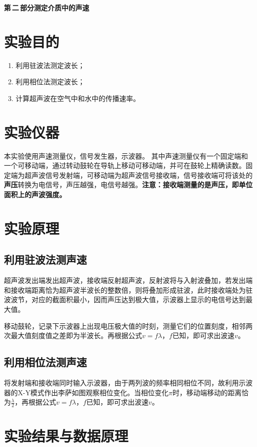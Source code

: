 \documentclass[11pt]{article}
\newcommand{\chapter}[2]{\begin{center}\bf\Large{第\,#1\,部分\quad #2}\end{center}}
\begin{document}
\chapter{二}{测定介质中的声速}

\section{实验目的}
\begin{enumerate}
	\item 利用驻波法测定波长；
	\item 利用相位法测定波长；
	\item 计算超声波在空气中和水中的传播速率。
\end{enumerate}

\section{实验仪器}
本实验使用声速测量仪，信号发生器，示波器。
其中声速测量仪有一个固定端和一个可移动端，通过转动鼓轮在导轨上移动可移动端，并可在鼓轮上精确读数。固定端为超声波信号发射端，可移动端为超声波信号接收端，信号接收端可将该处的\textbf{声压}转换为电信号，声压越强，电信号越强。\textbf{注意：接收端测量的是声压，即单位面积上的声波强度。}

\section{实验原理}
\subsection{利用驻波法测声速}
超声波发出端发出超声波，接收端反射超声波，反射波将与入射波叠加，若发出端和接收端距离恰为超声波半波长的整数倍，则将叠加形成驻波，此时接收端处为驻波波节，对应的截面积最小，因而声压达到极大值，示波器上显示的电信号达到最大值。

移动鼓轮，记录下示波器上出现电压极大值的时刻，测量它们的位置刻度，相邻两次最大值刻度值之差即为半波长。再根据公式\(v=f\lambda\)，\(f\)已知，即可求出波速\(v\)。
\subsection{利用相位法测声速}
将发射端和接收端同时输入示波器，由于两列波的频率相同相位不同，故利用示波器的X-Y模式作出李萨如图观察相位变化。当相位变化\(\pi\)时，移动端移动的距离恰为\(\frac{\lambda}{2}\)，再根据公式\(v=f\lambda\)，\(f\)已知，即可求出波速\(v\)。

\section{实验结果与数据原理}
\end{document}
